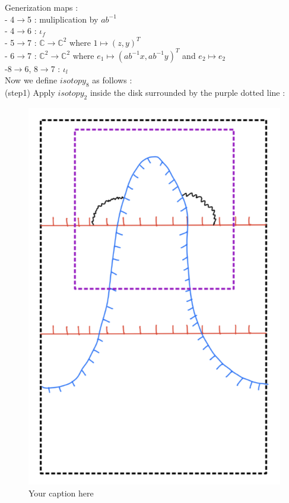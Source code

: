 Generization maps : \\
- 4$\rightarrow$5 : muliplication by $ab^{-1}$\\
- 4$\rightarrow$6 : $\iota_f$\\
- 5$\rightarrow$7 : $\mathbb{C}\rightarrow \mathbb{C}^2$ where $1\mapsto (z,y)^T$\\
- 6$\rightarrow$7 : $\mathbb{C}^2\rightarrow \mathbb{C}^2$ where $e_1 \mapsto (ab^{-1}x,ab^{-1}y)^T$ and $e_2 \mapsto e_2$\\
-8$\rightarrow$6, 8$\rightarrow$7 : $\iota_l$\\

Now we define $isotopy_8$ as follows :\\
(step1) Apply $isotopy_2$ inside the disk surrounded by the purple dotted line :
\begin{figure}[H] %
    \centering
    \includegraphics[width=\linewidth]{diagrams/lemma8/3.png} %
    \caption{Your caption here}
    \label{fig:your-label}
\end{figure}

